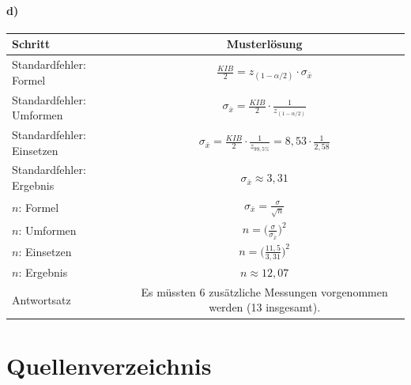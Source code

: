 \documentclass[
  11pt,
  ngerman,
  a4paper,
]{report}
\begin{document}
\hypertarget{d-7}{%
\subsubsection{d)}\label{d-7}}

\begin{table}[H]
\centering
\begin{tabular}{lc}
\toprule
Schritt & Musterlösung\\
\midrule
Standardfehler: Formel & $\frac{\mathit{KIB}}{2} = z_{(1-\alpha/2)} \cdot \sigma_{\bar{x}}$\\
Standardfehler: Umformen & $\sigma_{\bar{x}} = \frac{\mathit{KIB}}{2} \cdot \frac{1}{z_{(1-\alpha/2)}}$\\
Standardfehler: Einsetzen & $\sigma_{\bar{x}}=\frac{\mathit{KIB}}{2}\cdot \frac{1}{z_{99{,}5\%}} = 8{,}53 \cdot \frac{1}{2{,}58}$\\
Standardfehler: Ergebnis & $\sigma_{\bar{x}} \approx 3{,}31$\\
$n$: Formel & $\sigma_{\bar{x}}=\frac{\sigma}{\sqrt{n}}$\\
$n$: Umformen & $n=\Big(\frac{\sigma}{\sigma_{\bar{x}}}\Big)^2$\\
$n$: Einsetzen & $n=\Big(\frac{11{,}5}{3{,}31}\Big)^2$\\
$n$: Ergebnis & $n\approx12{,}07$\\
Antwortsatz & Es müssten 6 zusätzliche Messungen  vorgenommen werden (13 insgesamt).\\
\bottomrule
\end{tabular}
\end{table}

\hypertarget{quellenverzeichnis}{%
\chapter*{Quellenverzeichnis}\label{quellenverzeichnis}}
\end{document}
